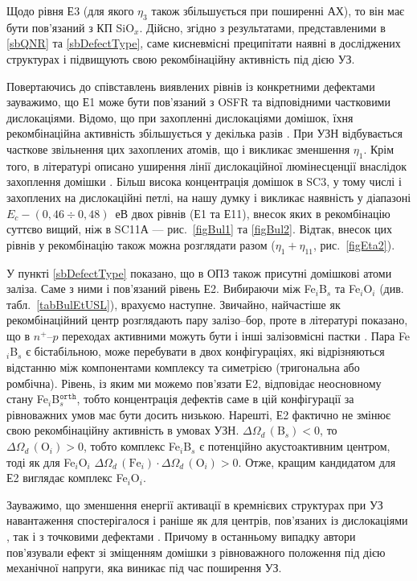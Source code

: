 Щодо рівня Е3 (для якого $\eta_3$ також збільшується при поширенні АХ),
то він має бути пов'язаний з КП SiO$_x$.
Дійсно, згідно з результатами, представленими в \ref{sbQNR} та \ref{sbDefectType},
саме кисневмісні преципітати наявні в досліджених структурах і підвищують свою рекомбінаційну активність під дією УЗ.

Повертаючись до співставлень виявлених рівнів із конкретними дефектами зауважимо,
що Е1 може бути пов'язаний з OSFR та відповідними частковими дислокаціями.
Відомо, що при захопленні дислокаціями домішок, їхня рекомбінаційна активність
збільшується у декілька разів \cite{disl10:Kveder,Kittler2003}.
При УЗН відбувається часткове звільнення цих захоплених атомів, що і викликає
зменшення  $\eta_1$.
Крім того, в літературі описано уширення  лінії дислокаційної люмінесценції внаслідок захоплення домішки  \cite{PhysRevB56:10208}.
Більш висока концентрація домішок в SC3, у тому числі і захоплених на дислокаційні петлі,
на нашу думку і викликає наявність у діапазоні $E_c-(0,46\div0,48)$~еВ двох рівнів (Е1 та Е11),
внесок яких в рекомбінацію суттєво вищий, ніж в SC11А --- рис.~\ref{figBul1} та \ref{figBul2}.
Відтак, внесок цих рівнів у рекомбінацію також можна розглядати разом ($\eta_1+\eta_{11}$, рис.~\ref{figEta2}).

У пункті \ref{sbDefectType} показано, що в ОПЗ також присутні домішкові атоми заліза.
Саме з ними і пов'язаний рівень Е2.
Вибираючи між Fe$_i$B$_s$ та Fe$_i$O$_i$ (див. табл.~\ref{tabBulEtUSL}), врахуємо наступне.
Звичайно, найчастіше як рекомбінаційний центр розглядають пару залізо--бор,
проте в літературі показано, що в $n^+$--$p$ переходах активними можуть бути і інші
залізовмісні пастки \cite{TeimurazPSS,TeimurazJAP}.
Пара  Fe$_i$B$_s$ є бістабільною, може перебувати в двох конфігураціях, які відрізняються відстанню між компонентами комплексу та симетрією (тригональна або ромбічна).
Рівень, із яким ми можемо пов'язати Е2, відповідає неосновному стану Fe$_i$B$_s^\mathtt{orth}$, тобто концентрація дефектів саме в цій конфігурації за рівноважних умов має бути досить низькою.
Нарешті, Е2 фактично не змінює свою рекомбінаційну активність в умовах УЗН.
$\Delta\Omega_d\,(\mbox{B}_s)<0$, то $\Delta\Omega_d\,(\mbox{O}_i)>0$, тобто комплекс
Fe$_i$B$_s$ є потенційно акустоактивним центром, тоді як для Fe$_i$O$_i$
$\Delta\Omega_d\,(\mbox{Fe}_i)\cdot\Delta\Omega_d\,(\mbox{O}_i)>0$.
Отже, кращим кандидатом для Е2 виглядає комплекс Fe$_i$O$_i$.

Зауважимо, що зменшення енергії активації в кремнієвих структурах при
УЗ навантаження спостерігалося і раніше як для центрів, пов'язаних із дислокаціями \cite{KorotchFTP1996}, так і з точковими дефектами \cite{Korotchenkov1995}.
Причому в останньому випадку автори пов'язували ефект зі зміщенням домішки з рівноважного положення під дією механічної напруги, яка виникає під час поширення УЗ.


